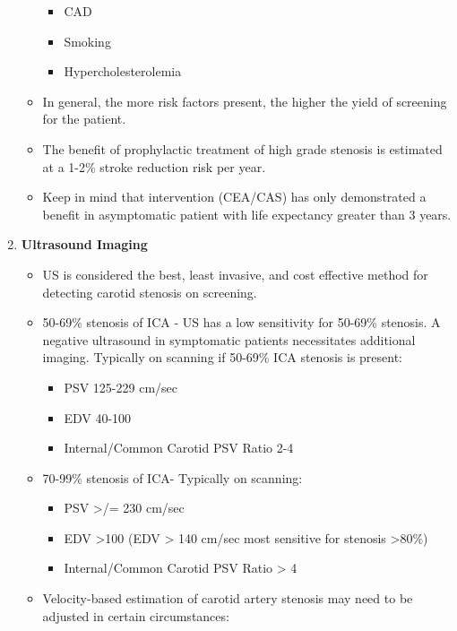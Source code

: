 \documentclass[
]{book}
\providecommand{\tightlist}{%
  \setlength{\itemsep}{0pt}\setlength{\parskip}{0pt}}
\begin{document}
\begin{enumerate}
\begin{itemize}
    \begin{itemize}
    \item
      CAD
    \item
      Smoking
    \item
      Hypercholesterolemia
    \end{itemize}
  \item
    In general, the more risk factors present, the higher the yield
    of screening for the patient.
  \item
    The benefit of prophylactic treatment of high grade stenosis is
    estimated at a 1-2\% stroke reduction risk per year.
    \citep{naylorWhyManagementAsymptomatic2015}
  \item
    Keep in mind that intervention (CEA/CAS) has only demonstrated a
    benefit in asymptomatic patient with life expectancy greater
    than 3 years. \citep{bulbuliaAsymptomaticCarotidSurgery2017, halliday10yearStrokePrevention2010, rosenfieldRandomizedTrialStent2016}
  \end{itemize}
\item
  \textbf{Ultrasound Imaging}

  \begin{itemize}
  \item
    US is considered the best, least invasive, and cost effective
    method for detecting carotid stenosis on screening.
  \item
    50-69\% stenosis of ICA - US has a low sensitivity for 50-69\%
    stenosis. A negative ultrasound in symptomatic patients
    necessitates additional imaging. Typically on scanning if 50-69\%
    ICA stenosis is present:

    \begin{itemize}
    \tightlist
    \item
      PSV 125-229 cm/sec
    \item
      EDV 40-100
    \item
      Internal/Common Carotid PSV Ratio 2-4
    \end{itemize}
  \item
    70-99\% stenosis of ICA- Typically on scanning:

    \begin{itemize}
    \item
      PSV \textgreater/= 230 cm/sec
    \item
      EDV \textgreater100 (EDV \textgreater{} 140 cm/sec most sensitive for stenosis \textgreater80\%)
    \item
      Internal/Common Carotid PSV Ratio \textgreater{} 4
    \end{itemize}
  \item
    Velocity-based estimation of carotid artery stenosis may need to
    be adjusted in certain circumstances:


\end{itemize}
\end{enumerate}
\end{document}
